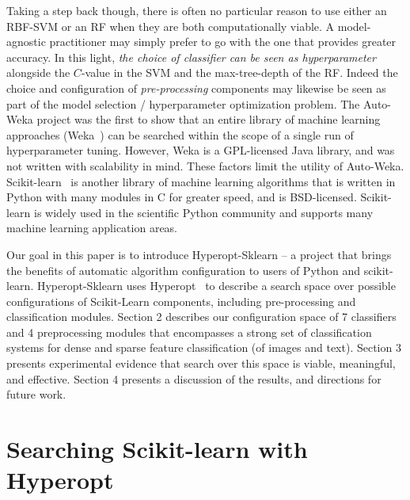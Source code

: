\documentclass[wcp]{jmlr}
\begin{document}
Taking a step back though, there is often no particular reason to use either an RBF-SVM or an RF when they are both computationally viable.
A model-agnostic practitioner may simply prefer to go with the one that provides greater accuracy.
In this light, {\em the choice of classifier can be seen as hyperparameter} alongside the $C$-value in the SVM and the max-tree-depth of the RF.
Indeed the choice and configuration of {\em pre-processing} components may likewise be seen as part of the model selection / hyperparameter optimization problem.
The Auto-Weka project \citep{thornton+hutter+hoos+leyton-brown:2012} was the first to show that an entire library of machine learning approaches (Weka~\citep{hall2009weka}) can be searched within the scope of a single run of hyperparameter tuning.
However, Weka is a GPL-licensed Java library, and was not written with scalability in mind. These factors limit the utility of Auto-Weka.
Scikit-learn~\citep{sklearn} is another library of machine learning algorithms that is written in Python with many modules in C for greater speed, and is BSD-licensed.
Scikit-learn is widely used in the scientific Python community and supports many machine learning application areas.

Our goal in this paper is to introduce Hyperopt-Sklearn -- a project that brings the benefits of automatic algorithm configuration to users of Python and scikit-learn.
Hyperopt-Sklearn uses Hyperopt~\citep{hyperopt} to describe a search space over possible configurations of Scikit-Learn components, including pre-processing and classification modules.
Section 2 describes our configuration space of 7 classifiers and 4 preprocessing modules that encompasses a strong set of classification systems for dense and sparse feature classification (of images and text).
Section 3 presents experimental evidence that search over this space is viable, meaningful, and effective.
Section 4 presents a discussion of the results, and directions for future work.


\section{Searching Scikit-learn with Hyperopt}
\end{document}

